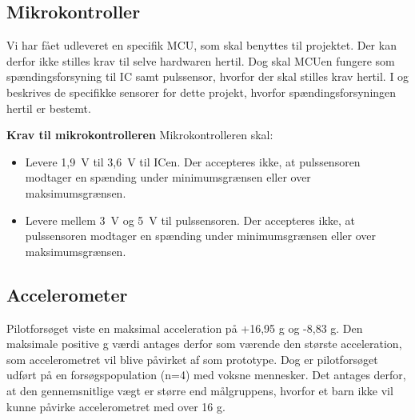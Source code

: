 \subsection{Mikrokontroller} \label{krav_mikro_spaending}
Vi har fået udleveret en specifik MCU, som skal benyttes til projektet. Der kan derfor ikke stilles krav til selve hardwaren hertil. Dog skal MCUen fungere som spændingsforsyning til IC samt pulssensor, hvorfor der skal stilles krav hertil. I  og  beskrives de specifikke sensorer for dette projekt, hvorfor spændingsforsyningen hertil er bestemt.

\textbf{Krav til mikrokontrolleren} \newline 
Mikrokontrolleren skal:
\begin{itemize}
	\item Levere 1,9~V til 3,6~V til ICen. Der accepteres ikke, at pulssensoren modtager en spænding under minimumsgrænsen eller over maksimumsgrænsen.
	\item Levere mellem 3~V og 5~V til pulssensoren. Der accepteres ikke, at pulssensoren modtager en spænding under minimumsgrænsen eller over maksimumsgrænsen.
\end{itemize}

\subsection{Accelerometer}\label{krav:acc}
Pilotforsøget viste en maksimal acceleration på +16,95 g og -8,83 g. Den maksimale positive g værdi antages derfor som værende den største acceleration, som accelerometret vil blive påvirket af som prototype. Dog er pilotforsøget udført på en forsøgspopulation (n=4) med voksne mennesker. Det antages derfor, at den gennemsnitlige vægt er større end målgruppens, hvorfor et barn ikke vil kunne påvirke accelerometret med over 16 g. %

